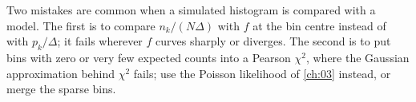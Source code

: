 \begin{pitfall}
Two mistakes are common when a simulated histogram is compared with a model. The first is to
compare $n_k/(N\Delta)$ with $f$ at the bin centre instead of with $p_k/\Delta$; it fails wherever
$f$ curves sharply or diverges. The second is to put bins with zero or very few expected counts
into a Pearson $\chi^2$, where the Gaussian approximation behind $\chi^2$ fails; use the
Poisson likelihood of \cref{ch:03} instead, or merge the sparse bins.
\end{pitfall}
\providecommand{\SixBUfM}{}\renewcommand{\SixBUfM}{20}
\providecommand{\SixBUfMuTot}{}\renewcommand{\SixBUfMuTot}{20\,000}
\providecommand{\SixBUfNmc}{}\renewcommand{\SixBUfNmc}{2\times10^{6}}
\providecommand{\SixBUfSigmaBins}{}\renewcommand{\SixBUfSigmaBins}{1.5}
\providecommand{\SixBUfStay}{}\renewcommand{\SixBUfStay}{25.7}
\providecommand{\SixBUfOne}{}\renewcommand{\SixBUfOne}{41.6}
\providecommand{\SixBUfTwo}{}\renewcommand{\SixBUfTwo}{32.7}
\providecommand{\SixBUfEffEdge}{}\renewcommand{\SixBUfEffEdge}{0.628}
\providecommand{\SixBUfEffMid}{}\renewcommand{\SixBUfEffMid}{1}
\providecommand{\SixBUfModelDep}{}\renewcommand{\SixBUfModelDep}{3.94}
\providecommand{\SixBUfMCrelerr}{}\renewcommand{\SixBUfMCrelerr}{0.62}
\providecommand{\SixBUfSmax}{}\renewcommand{\SixBUfSmax}{0.976}
\providecommand{\SixBUfSmin}{}\renewcommand{\SixBUfSmin}{2.018\times10^{-4}}
\providecommand{\SixBUfCond}{}\renewcommand{\SixBUfCond}{4834}
\providecommand{\SixBUfLamMinFormula}{}\renewcommand{\SixBUfLamMinFormula}{4.447\times10^{-5}}
\providecommand{\SixBUfNrelLo}{}\renewcommand{\SixBUfNrelLo}{2.5}
\providecommand{\SixBUfNrelHi}{}\renewcommand{\SixBUfNrelHi}{7.1}
\providecommand{\SixBUfInvRelMid}{}\renewcommand{\SixBUfInvRelMid}{73.4}
\providecommand{\SixBUfInvSdMid}{}\renewcommand{\SixBUfInvSdMid}{32000}
\providecommand{\SixBUfInvRho}{}\renewcommand{\SixBUfInvRho}{-0.726}
\providecommand{\SixBUfMuMid}{}\renewcommand{\SixBUfMuMid}{436}
\providecommand{\SixBUfInvAmp}{}\renewcommand{\SixBUfInvAmp}{1120}
\providecommand{\SixBUfTauMSE}{}\renewcommand{\SixBUfTauMSE}{1.413\times10^{-5}}
\providecommand{\SixBUfTauL}{}\renewcommand{\SixBUfTauL}{1.000\times10^{-6}}
\providecommand{\SixBUfMSEmin}{}\renewcommand{\SixBUfMSEmin}{5268}
\providecommand{\SixBUfBiasAtMin}{}\renewcommand{\SixBUfBiasAtMin}{53.1}
\providecommand{\SixBUfSdAtMin}{}\renewcommand{\SixBUfSdAtMin}{49.4}
\providecommand{\SixBUfMSEinv}{}\renewcommand{\SixBUfMSEinv}{1.752\times10^{9}}
\providecommand{\SixBUfRmsInv}{}\renewcommand{\SixBUfRmsInv}{41200}
